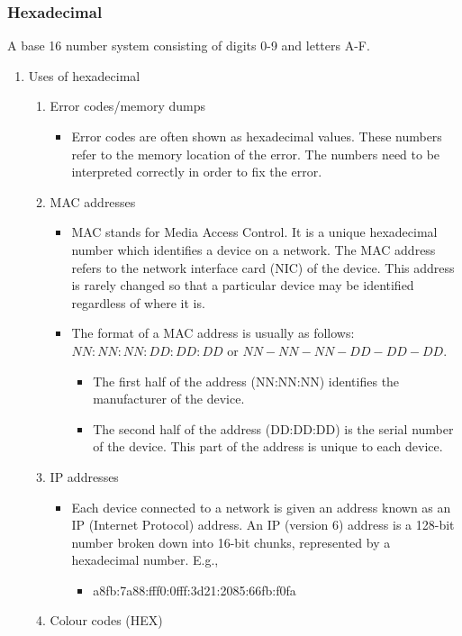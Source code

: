 \documentclass[11pt]{article}
\begin{document}
\subsubsection{Hexadecimal}
\label{sec:org4f536c6}
A base 16 number system consisting of digits 0-9 and letters A-F.
\begin{enumerate}
\item Uses of hexadecimal
\label{sec:org970c512}
\begin{enumerate}
\item Error codes/memory dumps
\begin{itemize}
\item Error codes are often shown as hexadecimal values. These numbers refer to the memory location of the error. The numbers need to be interpreted correctly in order to fix the error.
\end{itemize}
\item MAC addresses
\begin{itemize}
\item MAC stands for Media Access Control. It is a unique hexadecimal number which identifies a device on a network. The MAC address refers to the network interface card (NIC) of the device. This address is rarely changed so that a particular device may be identified regardless of where it is.
\item The format of a MAC address is usually as follows: \(NN:NN:NN:DD:DD:DD\) or \(NN-NN-NN-DD-DD-DD\).
\begin{itemize}
\item The first half of the address (NN:NN:NN) identifies the manufacturer of the device.
\item The second half of the address (DD:DD:DD) is the serial number of the device. This part of the address is unique to each device.
\end{itemize}
\end{itemize}
\item IP addresses
\begin{itemize}
\item Each device connected to a network is given an address known as an IP (Internet Protocol) address. An IP (version 6) address is a 128-bit number broken down into 16-bit chunks, represented by a hexadecimal number. E.g.,
\begin{itemize}
\item a8fb:7a88:fff0:0fff:3d21:2085:66fb:f0fa
\end{itemize}
\end{itemize}
\item Colour codes (HEX)

\end{enumerate}
\end{enumerate}
\end{document}
